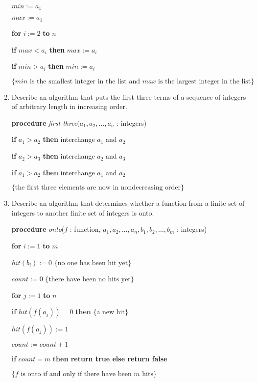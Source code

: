 \documentclass[11pt]{article}
\begin{document}
\begin{enumerate}[label=\textbf{\arabic*.}]
	$min := a_1$
	
	$max := a_1$
	
	\textbf{for} $i := 2$ \textbf{to} $n$
	
	\qquad \textbf{if} $max < a_i$ \textbf{then} $max := a_i$
	
	\qquad \textbf{if} $min > a_i$ \textbf{then} $min := a_i$
	
	$\{ min \text{ is the smallest integer in the list and } max \text{ is the largest integer in the list} \}$
	
	\item Describe an algorithm that puts the first three terms of a sequence of integers of arbitrary length in increasing order.
	
	\textbf{procedure} \emph{first three}($a_1, a_2, \ldots, a_n$ : integers)
	
	\textbf{if} $a_1 > a_2$ \textbf{then} interchange $a_1$ and $a_2$
	
	\textbf{if} $a_2 > a_3$ \textbf{then} interchange $a_2$ and $a_3$
	
	\textbf{if} $a_1 > a_2$ \textbf{then} interchange $a_1$ and $a_2$
	
	$\{ \text{the first three elements are now in nondecreasing order} \}$
	
	\item Describe an algorithm that determines whether a function from a finite set of integers to another finite set of integers is onto.
	
	\textbf{procedure} \emph{onto}($f$ : function, $a_1, a_2, \ldots, a_n, b_1, b_2, \ldots, b_m$ : integers)
	
	\textbf{for} $i := 1$ \textbf{to} $m$
	
	\qquad $hit(b_i) := 0$	$\{ \text{no one has been hit yet} \}$
	
	$count := 0$	$\{ \text{there have been no hits yet} \}$
	
	\textbf{for} $j := 1$ \textbf{to} $n$
	
	\qquad \textbf{if} $hit(f(a_j)) = 0$ \textbf{then}	$\{ \text{a new hit} \}$
	
	\qquad\qquad $hit(f(a_j)) := 1$
	
	\qquad\qquad $count := count + 1$
	
	\textbf{if} $count = m$ \textbf{then return true else return false}
	
	$\{ f \text{ is onto if and only if there have been } m \text{ hits} \}$
\end{enumerate}
\end{document}
